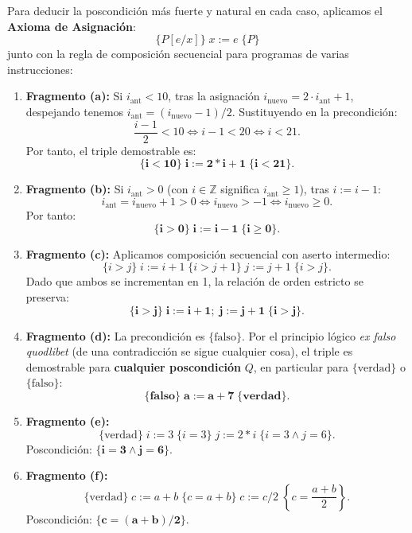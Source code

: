 \begin{solucion}
Para deducir la poscondición más fuerte y natural en cada caso, aplicamos el \textbf{Axioma de Asignación}:
\[
\{P[e/x]\} \; x := e \; \{P\}
\]
junto con la regla de composición secuencial para programas de varias instrucciones:

\begin{enumerate}[label=(\alph*),leftmargin=*]
    \item \textbf{Fragmento (a):} Si $i_{\text{ant}} < 10$, tras la asignación $i_{\text{nuevo}} = 2 \cdot i_{\text{ant}} + 1$, despejando tenemos $i_{\text{ant}} = (i_{\text{nuevo}} - 1)/2$. Sustituyendo en la precondición:
    \[
    \frac{i - 1}{2} < 10 \iff i - 1 < 20 \iff i < 21.
    \]
    Por tanto, el triple demostrable es:
    \[
    \mathbf{\{i < 10\} \; i := 2 * i + 1 \; \{i < 21\}}.
    \]

    \item \textbf{Fragmento (b):} Si $i_{\text{ant}} > 0$ (con $i \in \mathbb{Z}$ significa $i_{\text{ant}} \ge 1$), tras $i := i - 1$:
    \[
    i_{\text{ant}} = i_{\text{nuevo}} + 1 > 0 \iff i_{\text{nuevo}} > -1 \iff i_{\text{nuevo}} \ge 0.
    \]
    Por tanto:
    \[
    \mathbf{\{i > 0\} \; i := i - 1 \; \{i \ge 0\}}.
    \]

    \item \textbf{Fragmento (c):} Aplicamos composición secuencial con aserto intermedio:
    \[
    \{i > j\} \; i := i + 1 \; \{i > j + 1\} \; j := j + 1 \; \{i > j\}.
    \]
    Dado que ambos se incrementan en 1, la relación de orden estricto se preserva:
    \[
    \mathbf{\{i > j\} \; i := i + 1; \; j := j + 1 \; \{i > j\}}.
    \]

    \item \textbf{Fragmento (d):} La precondición es $\{\text{falso}\}$. Por el principio lógico \textit{ex falso quodlibet} (de una contradicción se sigue cualquier cosa), el triple es demostrable para \textbf{cualquier poscondición} $Q$, en particular para $\{\text{verdad}\}$ o $\{\text{falso}\}$:
    \[
    \mathbf{\{\text{falso}\} \; a := a + 7 \; \{\text{verdad}\}}.
    \]

    \item \textbf{Fragmento (e):}
    \[
    \{\text{verdad}\} \; i := 3 \; \{i = 3\} \; j := 2 * i \; \{i = 3 \land j = 6\}.
    \]
    Poscondición: $\mathbf{\{i = 3 \land j = 6\}}$.

    \item \textbf{Fragmento (f):}
    \[
    \{\text{verdad}\} \; c := a + b \; \{c = a + b\} \; c := c / 2 \; \left\{c = \frac{a + b}{2}\right\}.
    \]
    Poscondición: $\mathbf{\{c = (a + b) / 2\}}$.
\end{enumerate}
\end{solucion}

